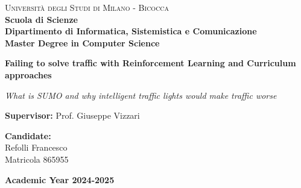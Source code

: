 \documentclass[a4paper,10pt,oneside]{book}
\begin{document}
    
    \begin{titlepage}
        
        \noindent
        \begin{minipage}[t]{0.19\textwidth}
        \end{minipage}
        \begin{minipage}[t]{0.81\textwidth}
        {
                {\textsc{Università degli Studi di Milano - Bicocca}} \\
                \textbf{Scuola di Scienze} \\
                \textbf{Dipartimento di Informatica, Sistemistica e Comunicazione} \\
                \textbf{Master Degree in Computer Science} \\
                \par
        }
        \end{minipage}
        
	\vspace{40mm}
        
	\begin{center}
            {\LARGE{
                    \textbf{Failing to solve traffic with Reinforcement Learning and Curriculum approaches}
                    \par
            }}
            {\large{
                    \textit{What is SUMO and why intelligent traffic lights would make traffic worse}
                    \par
            }}
        \end{center}
        
        \vspace{50mm}

        \noindent
        {\large \textbf{Supervisor:} Prof. Giuseppe Vizzari}
        
        \vspace{15mm}

        \begin{flushright}
            {\large \textbf{Candidate:}} \\
            \large{Refolli Francesco} \\
            \large{Matricola 865955} 
        \end{flushright}
        
        \vspace{40mm}
        \begin{center}
            {\large{\bf Academic Year 2024-2025}}
        \end{center}

        \restoregeometry
        
    \end{titlepage}

    
    \printindex
    \tableofcontents
    \renewcommand{\baselinestretch}{1.5} 
    
    \printbibliography
\end{document}
